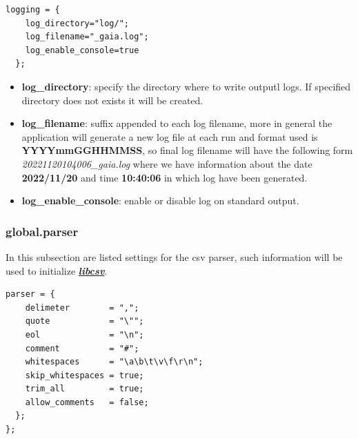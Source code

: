 \documentclass[12pt, a4paper]{book}
\begin{document}
\begin{small}
\begin{lstlisting}[backgroundcolor=\color{gray},frame=single]
  logging = {
    log_directory="log/";
    log_filename="_gaia.log";
    log_enable_console=true  
  };
\end{lstlisting} 
\end{small} 
\begin{itemize}
\item \textbf{log\_directory}: specify the directory where to write outputl logs. 
If specified directory does not exists it will be created.  
\item \textbf{log\_filename}: suffix appended to each log filename, more in general the\newline 
application will generate a new log file at each run and format used \newline
is \textbf{YYYYmmGGHHMMSS}, so final log filename will have the following\newline
form \textit{20221120104006\_gaia.log} where we have information about the\newline 
date \textbf{2022/11/20} and time \textbf{10:40:06} in which log have been generated.
\item \textbf{log\_enable\_console}: enable or disable log on standard output.
\end{itemize}

\newpage
\subsubsection{global.parser}

In this subsection are listed settings for the csv parser, such information will be used to initialize \href{https://github.com/fe-dagostino/libcsv}{\textit{\textbf{libcsv}}}.

\begin{small}
\begin{lstlisting}[backgroundcolor=\color{gray},frame=single]
  parser = {
    delimeter        = ",";
    quote            = "\"";
    eol              = "\n";
    comment          = "#";
    whitespaces      = "\a\b\t\v\f\r\n";
    skip_whitespaces = true;
    trim_all         = true;
    allow_comments   = false;
  };
};
\end{lstlisting}
\end{small}
\end{document}

